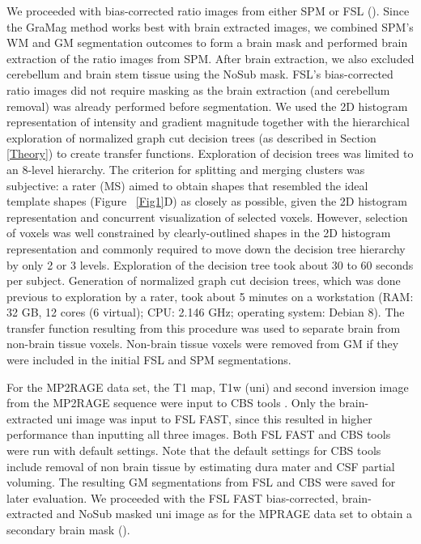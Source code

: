 We proceeded with bias-corrected ratio images from either SPM or FSL (). Since the GraMag method works best with brain extracted images, we combined SPM's WM and GM segmentation outcomes to form a brain mask and performed brain extraction of the ratio images from SPM. After brain extraction, we also excluded cerebellum and brain stem tissue using the NoSub mask. FSL's bias-corrected ratio images did not require masking as the brain extraction (and cerebellum removal) was already performed before segmentation. We used the 2D histogram representation of intensity and gradient magnitude together with the hierarchical exploration of normalized graph cut decision trees (as described in Section \ref{Theory}) to create transfer functions. Exploration of decision trees was limited to an 8-level hierarchy. The criterion for splitting and merging clusters was subjective: a rater (MS) aimed to obtain shapes that resembled the ideal template shapes (Figure ~\ref{Fig1}D) as closely as possible, given the 2D histogram representation and concurrent visualization of selected voxels. However, selection of voxels was well constrained by clearly-outlined shapes in the 2D histogram representation and commonly required to move down the decision tree hierarchy by only 2 or 3 levels. Exploration of the decision tree took about 30 to 60 seconds per subject. Generation of normalized graph cut decision trees, which was done previous to exploration by a rater, took about 5 minutes on a workstation  (RAM: 32 GB, 12 cores (6 virtual); CPU: 2.146 GHz; operating system: Debian 8). The transfer function resulting from this procedure was used to separate brain from non-brain tissue voxels. Non-brain tissue voxels were removed from GM if they were included in the initial FSL and SPM segmentations.

For the MP2RAGE data set, the T1 map, T1w (uni) and second inversion image from the MP2RAGE sequence were input to CBS tools \parencite{Bazin2014}. Only the brain-extracted \parencite{Smith2002} uni image was input to FSL FAST, since this resulted in higher performance than inputting all three images. Both FSL FAST and CBS tools were run with default settings. Note that the default settings for CBS tools include removal of non brain tissue by estimating dura mater and CSF partial voluming. The resulting GM segmentations from FSL and CBS were saved for later evaluation. We proceeded with the FSL FAST bias-corrected, brain-extracted and NoSub masked uni image as for the MPRAGE data set to obtain a secondary brain mask ().

